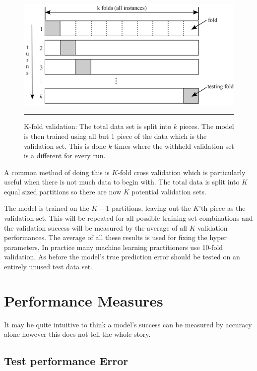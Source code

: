 \begin{figure}[htbp]
	\centering
		\includegraphics{./Figures/k_fold_validation.jpeg}
		\rule{35em}{0.5pt}
	\caption[k-fold Validation]{K-fold validation: The total data set is split into $k$ pieces. The model is then trained using all but 1 piece of the data which is the validation set. This is done $k$ times where the withheld validation set is a different for every run.}
	\label{fig:k_fold_validation}
\end{figure}

A common method of doing this is $K$-fold cross validation which is particularly useful when there is not much data to begin with\citep{barber2012bayesian}.
The total data is split into $K$ equal sized  partitions so there are now $K$ potential validation sets.

The model is trained on the $K-1$ partitions, leaving out the $K$'th piece as the validation set.
This will be repeated for all possible training set combinations and the validation success will be measured by the average of all $K$ validation performances.
The average of all these results is used for fixing the hyper parameters,
In practice many machine learning practitioners use 10-fold validation.
As before the model's true prediction error should be tested on an entirely unused test data set.

\section{Performance Measures}

It may be quite intuitive to think a model's success can be measured by accuracy alone however this does not tell the whole story.
 
	\subsection{Test performance Error}

